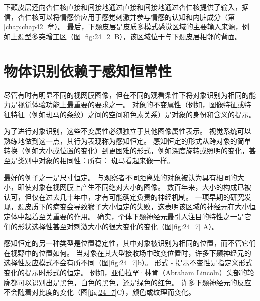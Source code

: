 下颞皮层还向杏仁核直接和间接地通过直接和间接地通过杏仁核提供了输入，据信，杏仁核可以将情感价应用于感觉刺激并参与情感的认知和内脏成分（第 \ref{chap:chap42} 章）。
最后，下颞皮层是皮质多模式感觉区域的主要输入来源，例如上颞型多突增工区（图 \ref{fig:24_2} B），该区域位于与下颞皮层相邻的背面。


\section{物体识别依赖于感知恒常性}

尽管有时有明显不同的视网膜图像，但在不同的观看条件下将对象识别为相同的能力是视觉体验功能上最重要的要求之一。
对象的不变属性（例如，图像特征或特征特征（例如斑马的条纹）之间的空间和色素关系）是对象的身份和含义的提示。


为了进行对象识别，这些不变属性必须独立于其他图像属性表示。
视觉系统可以熟练地做到这一点，其行为表现称为感知恒定。
感知恒定的形式从跨对象的简单转换（例如大小或位置的变化）到更困难的形式，例如深度旋转或照明的变化，甚至是类别中对象的相同性：所有： 斑马看起来像一样。


最好的例子之一是尺寸恒定。
与观察者不同距离处的对象被认为具有相同的大小，即使对象在视网膜上产生不同绝对大小的图像。
数百年来，大小的构成已被认可，但仅在过去几十年中，才有可能确定负责的神经机制。
一项早期的研究发现，颞皮质下的病变会导致猴子大小恒定的失败，这表明该区域的神经元在大小恒定体中起着至关重要的作用。
确实，个体下颞神经元最引人注目的特性之一是它们的形状选择性甚至对刺激大小的很大变化的变化（图\ref{fig:24_7} A）。


感知恒定的另一种类型是位置稳定性，其中对象被识别为相同的位置，而不管它们在视野中的位置如何。
当对象在其大型接收场中改变位置时，许多下颞神经元的选择性反应模式不会有所不同（图\ref{fig:24_7}b）。
形式 - 提示不变性是指定义形式变化的提示时形式的恒定。
例如，亚伯拉罕·林肯（Abraham Lincoln）头部的轮廓都可以识别出是黑色，白色的黑色，还是绿色的红色。 
许多下颞神经元的反应不会随着对比度的变化（图\ref{fig:24_7}C），颜色或纹理而变化。


